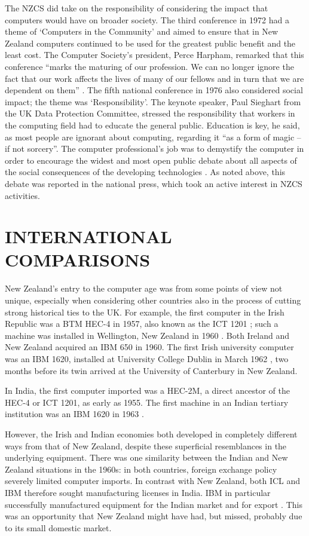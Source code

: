 \documentclass{IEEEcsmag}
\begin{document}
The NZCS did take on the responsibility of considering the impact that computers would have on 
broader society. The third conference in 1972 had a theme of ‘Computers in the Community’ and
aimed to ensure that in New Zealand computers continued to be used for the greatest public benefit
and the least cost. The Computer Society’s president, Perce Harpham, remarked that this conference
“marks the maturing of our profession. We can no longer ignore the fact that our work affects the lives 
of many of our fellows and in turn that we are dependent on them” \cite{Harpham1972}. The fifth national conference in 
1976 also considered social impact; the theme was  ‘Responsibility’.  The keynote speaker, Paul Sieghart 
from the UK Data Protection Committee, stressed the responsibility that workers in the computing field 
had to educate the general public. Education is key, he said, as most people are ignorant about computing, 
regarding it “as a form of magic – if not sorcery”. The computer professional’s job was to demystify the 
computer in order to encourage the widest and most open public debate about all aspects of the social 
consequences of the developing technologies \cite{Sieghart1976}.
\cbstart
As noted above, this debate was reported in the national press, which took an active interest in NZCS activities.
\vspace*{-8pt}
\section{INTERNATIONAL COMPARISONS}
\cbend
New Zealand’s entry to the computer age was from some points of view not unique,
especially when considering other countries also in the process of cutting strong historical ties to the UK.
For example, the first computer in the Irish Republic was a BTM HEC-4 in 1957,
also known as the ICT 1201 \cite{Ireland-first}; such a machine was installed in
Wellington, New Zealand in 1960 \cite{FirstCinNZ}. Both Ireland and New Zealand
acquired an IBM 650 in 1960. The first Irish university computer was an IBM 1620, 
installed at University College Dublin in March 1962 \cite{Ireland-first}, two months before its twin
arrived at the University of Canterbury in New Zealand.

In India, the first computer imported was a HEC-2M, a direct ancestor of the HEC-4 or ICT 1201,
as early as 1955. The first machine in an Indian tertiary institution was an
IBM 1620 in 1963 \cite{Rajaraman-2015}. 

However, the Irish and Indian economies
both developed in completely different ways from that of New Zealand, despite
these superficial resemblances in the underlying equipment.
There was one similarity between the Indian and New Zealand
situations in the 1960s: in both countries, foreign exchange policy
severely limited computer imports. In contrast with New Zealand, both ICL 
and IBM therefore sought manufacturing licenses in India. IBM in particular successfully
manufactured equipment for the Indian market and for export \cite{Rajaraman-2015}.
\cbstart 
This was an opportunity that New Zealand might have had, but missed, probably due to its small domestic market.
\end{document}
